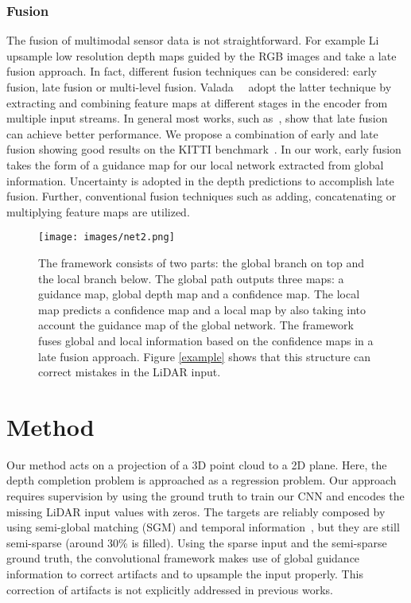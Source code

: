 \documentclass{main_style}
\begin{document}
\subsubsection{Fusion}
The fusion of multimodal sensor data is not straightforward.
For example Li~\etal~\cite{li} upsample low resolution depth maps guided by the RGB images and take a late fusion approach. In fact, different fusion techniques can be considered: early fusion, late fusion or multi-level fusion. Valada~\etal~\cite{valada} adopt the latter technique by extracting and combining feature maps at different stages in the encoder from multiple input streams. In general most works, such as~\cite{jaritz, eld2}, show that late fusion can achieve better performance. We propose a combination of early and late fusion showing good results on the KITTI benchmark~\cite{kitti}. In our work, early fusion takes the form of a guidance map for our local network extracted from global information. Uncertainty is adopted in the depth predictions to accomplish late fusion. Further, conventional fusion techniques such as adding, concatenating or multiplying feature maps are utilized. 

\begin{figure*}[t]
\noindent
  \begin{center}
    \texttt{[image: images/net2.png]}
  \end{center}
  \caption{
    The framework consists of two parts: the global branch on top and the local branch below. The global path outputs three maps: a guidance map, global depth map and a confidence map. The local map predicts a confidence map and a local map by also taking into account the guidance map of the global network. The framework fuses global and local information based on the confidence maps in a late fusion approach. Figure \ref{example} shows that this structure can correct mistakes in the LiDAR input.
  }
  \label{net}
\end{figure*}
\section{Method} \label{method}
Our method acts on a projection of a 3D point cloud to a 2D plane.
Here, the depth completion problem is approached as a regression problem.  Our approach requires supervision by using the ground truth to train our CNN and encodes the missing LiDAR input values with zeros. The targets are reliably composed by using semi-global matching (SGM) and temporal information~\cite{sparsity}, but they are still semi-sparse (around 30\% is filled). Using the sparse input and the semi-sparse ground truth, the convolutional framework makes use of global guidance information to correct artifacts and to upsample the input properly. This correction of artifacts is not explicitly addressed in previous works.
\end{document}

